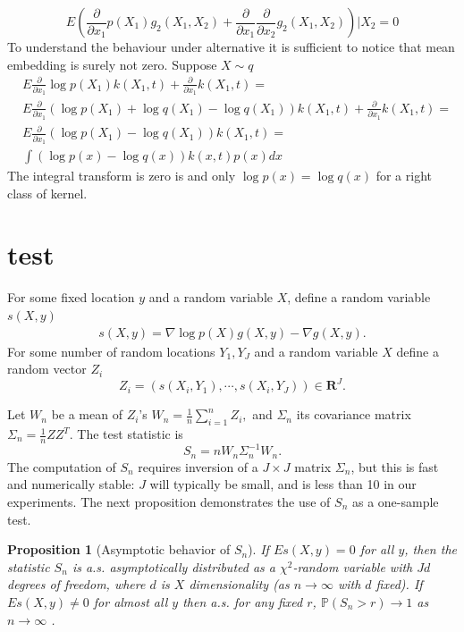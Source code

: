 \documentclass{article}
\newtheorem{proposition}{Proposition}
\begin{document}
$$
E \left ( \frac{\partial } {\partial x_1} p(X_1) g_2(X_1,X_2) 
+  \frac{\partial } {\partial x_1}\frac{\partial } {\partial x_2} g_2(X_1,X_2) \right )| X_2 = 0
$$
To understand the behaviour under alternative it is sufficient to notice that mean embedding is surely not zero. Suppose $X \sim q$
\begin{align}
 &E \frac{\partial } {\partial x_1} \log p(X_1) k(X_1,t) + \frac{\partial } {\partial x_1} k(X_1,t) =\\
 &E  \frac{\partial } {\partial x_1} ( \log  p(X_1) + \log  q(X_1)- \log  q(X_1)  )  k(X_1,t)   + \frac{\partial } {\partial x_1} k(X_1,t) = \\
 &E  \frac{\partial } {\partial x_1} (\log p(X_1) - \log q(X_1))k(X_1,t)   = \\
 & \int  (\log p(x) - \log q(x) ) k(x,t) p(x) dx
\end{align}
The integral transform is zero is and only $\log p(x) = \log q(x)$ for a right class of kernel.

\section{test}
For some fixed location $y$ and a random variable $X$, define a random variable $s(X,y)$
\begin{align}
 s(X,y) = \nabla \log p(X) g(X,y) -  \nabla g(X,y).
\end{align}
For some number of random locations $Y_1,Y_J$ and a random variable $X$ define a random vector $Z_i$
\begin{equation}
 Z_i = ( s(X_i,Y_1) , \cdots, s(X_i,Y_J)  )\in \mathbf R^J.
\end{equation}

Let $W_n$ be a mean of $Z_i$'s
$W_n = \frac 1  n \sum_{i=1}^n Z_i, $
and $\Sigma_n$ its  covariance matrix
$\Sigma_n = \frac 1  n Z Z^{T}$.
The test statistic is
\begin{equation}
 S_n = n W_n \Sigma_n^{-1} W_n.
\end{equation}
The computation of $S_n$ requires inversion of a $J\times J$ matrix $\Sigma_n$, but this is fast and numerically stable: $J$ will typically be small, and is less than 10 in our experiments. The next proposition demonstrates the use of $S_n$ as a one-sample test.
\begin{proposition}[Asymptotic behavior of $S_n$]
\label{prop:Hotelling}
 If  $E s(X,y)=0$ for all $y$, then the statistic $S_n$ is a.s. asymptotically distributed as a $\chi^2$-random variable with $Jd$ degrees of freedom, where $d$ is $X$ dimensionality (as $n \to \infty$ with $d$ fixed). If  $E s(X,y) \neq 0$ for almost all $y$ then a.s. for any fixed $r$, $\mathbb P(S_n > r) \to 1$  as $n \to \infty$ .
\end{proposition}
\end{document}
